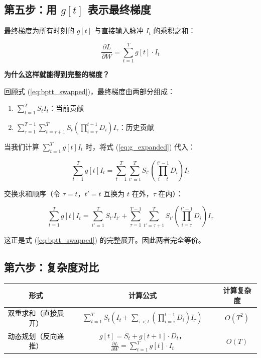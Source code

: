 \documentclass[journal,12pt,onecolumn]{IEEEtran}
\begin{document}
\subsection{第五步：用 \(g[t]\) 表示最终梯度}

最终梯度为所有时刻的 \(g[t]\) 与直接输入脉冲 \(I_t\) 的乘积之和：

\begin{equation}
\boxed{
\frac{\partial L}{\partial W} = \sum_{t=1}^T g[t] \cdot I_t
}
\label{eq:gradient_final}
\end{equation}

\textbf{为什么这样就能得到完整的梯度？}

回顾式 (\ref{eq:bptt_swapped})，最终梯度由两部分组成：
\begin{enumerate}
    \item \(\sum_{t=1}^T S_t I_t\)：当前贡献
    \item \(\sum_{\tau=1}^{T-1} \sum_{t=\tau+1}^{T} S_t \left( \prod_{i=\tau}^{t-1} D_i \right) I_\tau\)：历史贡献
\end{enumerate}

当我们计算 \(\sum_{t=1}^T g[t] I_t\) 时，将式 (\ref{eq:g_expanded}) 代入：

\begin{equation}
\sum_{t=1}^T g[t] I_t
=
\sum_{t=1}^T \sum_{t'=t}^{T} S_{t'} \left( \prod_{i=t}^{t'-1} D_i \right) I_t
\end{equation}

交换求和顺序（令 \(\tau = t\)，\(t' = t\) 互换为 \(t\) 在外，\(\tau\) 在内）：

\begin{equation}
\sum_{t=1}^T g[t] I_t
=
\sum_{t'=1}^{T} S_{t'} I_{t'}
+
\sum_{\tau=1}^{T-1} \sum_{t'=\tau+1}^{T} S_{t'} \left( \prod_{i=\tau}^{t'-1} D_i \right) I_\tau
\end{equation}

这正是式 (\ref{eq:bptt_swapped}) 的完整展开。因此两者完全等价。

\subsection{第六步：复杂度对比}

\begin{center}
\begin{tabular}{|c|c|c|}
\hline
\textbf{形式} & \textbf{计算公式} & \textbf{计算复杂度} \\
\hline
双重求和（直接展开） & \(\displaystyle \sum_{t=1}^T S_t \left( I_t + \sum_{\tau < t} \left( \prod_{i=\tau}^{t-1} D_i \right) I_\tau \right)\) & \(O(T^2)\) \\
动态规划（反向递推） & \(g[t] = S_t + g[t+1] \cdot D_t\)，\(\displaystyle \frac{\partial L}{\partial W} = \sum_{t=1}^T g[t] \cdot I_t\) & \(O(T)\) \\
\hline
\end{tabular}
\end{center}
\end{document}
